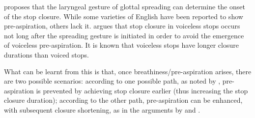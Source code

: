 \documentclass[
  11pt,
  a4paper,
]{article}
\begin{document}
\citet{lisker1974} proposes that the laryngeal gesture of glottal
spreading can determine the onset of the stop closure. While some
varieties of English have been reported to show pre-aspiration, others
lack it. \citeauthor{lisker1974} argues that stop closure in voiceless
stops occurs not long after the spreading gesture is initiated in order
to avoid the emergence of voiceless pre-aspiration. It is known that
voiceless stops have longer closure durations than voiced stops.

What can be learnt from this is that, once breathiness/pre-aspiration
arises, there are two possible scenarios: according to one possible
path, as noted by \citet{lisker1974}, pre-aspiration is prevented by
achieving stop closure earlier (thus increasing the stop closure
duration); according to the other path, pre-aspiration can be enhanced,
with subsequent closure shortening, as in the arguments by
\citet{nichasaide1985} and \citet{stevens2014}.

  
\end{document}
